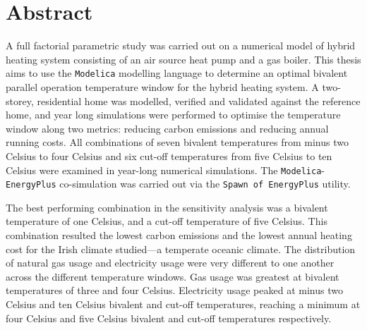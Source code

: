 

\begingroup
\let\clearpage\relax
\let\cleardoublepage\relax
\let\cleardoublepage\relax

\chapter*{Abstract}

A full factorial parametric study was carried out on a numerical model of hybrid heating system consisting of an air source heat pump and a gas boiler. This thesis aims to use the \texttt{Modelica} modelling language to determine an optimal bivalent parallel operation temperature window for the hybrid heating system. A two-storey, residential home was modelled, verified and validated against the reference home, and year long simulations were performed to optimise the temperature window along two metrics: reducing carbon emissions and reducing annual running costs. All combinations of seven bivalent temperatures from minus two Celsius to four Celsius and six cut-off temperatures from five Celsius to ten Celsius were examined in year-long numerical simulations. The \texttt{Modelica}-\texttt{EnergyPlus} co-simulation was carried out via the \texttt{Spawn of EnergyPlus} utility.

The best performing combination in the sensitivity analysis was a bivalent temperature of one Celsius, and  a cut-off temperature of five Celsius. This combination resulted the lowest carbon emissions and the lowest annual heating cost for the Irish climate studied---a temperate oceanic climate. The distribution of natural gas usage and electricity usage were very different to one another across the different temperature windows. Gas usage was greatest at bivalent temperatures of three and four Celsius. Electricity usage peaked at minus two Celsius and ten Celsius bivalent and cut-off temperatures, reaching a minimum at four Celsius and five Celsius bivalent and cut-off temperatures respectively. 

